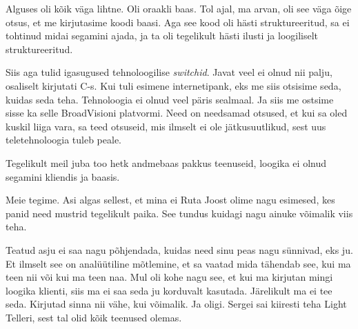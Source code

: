 Alguses oli kõik väga lihtne. Oli oraakli baas. Tol ajal, ma arvan,  oli see väga õige otsus, et me kirjutasime koodi baasi. Aga see kood oli hästi struktureeritud, sa ei tohtinud midai segamini ajada, ja ta oli tegelikult hästi ilusti ja loogiliselt struktureeritud. 

Siis aga tulid igasugused tehnoloogilise \emph{switchid}. Javat veel  ei olnud nii palju, osaliselt kirjutati C-s. Kui tuli esimene internetipank, eks me siis otsisime  seda, kuidas seda teha. Tehnoloogia ei olnud veel päris sealmaal. Ja siis me ostsime  sisse ka selle BroadVisioni platvormi. Need on needsamad otsused, et kui sa oled  kuskil liiga vara, sa teed  otsuseid, mis ilmselt ei ole  jätkusuutlikud, sest uus teletehnoloogia tuleb peale. 


Tegelikult meil  juba too hetk andmebaas pakkus teenuseid, loogika ei olnud segamini kliendis ja baasis. 


Meie tegime. Asi algas  sellest, et mina ei Ruta Joost olime nagu esimesed, kes panid need mustrid tegelikult paika. See tundus kuidagi nagu ainuke võimalik viis teha. 


Teatud asju ei saa nagu põhjendada, kuidas need sinu peas nagu sünnivad, eks ju. Et ilmselt see on analüütiline mõtlemine, et sa vaatad mida tähendab see, kui ma teen nii või kui ma teen naa. Mul oli kohe nagu see, et kui ma kirjutan mingi loogika klienti, siis ma ei saa seda ju korduvalt kasutada. Järelikult ma ei tee seda. Kirjutad sinna nii vähe, kui võimalik. Ja oligi. Sergei sai kiiresti teha Light Telleri, sest tal olid kõik teenused  olemas. 


